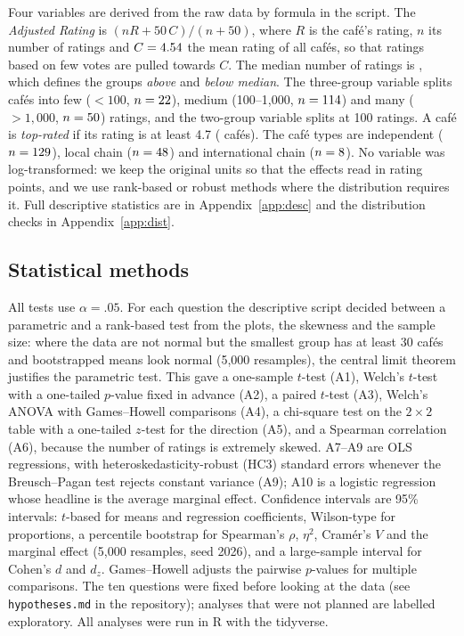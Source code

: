 \documentclass[11pt,a4paper]{article}
\begin{document}
Four variables are derived from the raw data by formula in the script. The \emph{Adjusted Rating} is $(n R + 50\,C)/(n + 50)$, where $R$ is the caf\'e's rating, $n$ its number of ratings and $C=4.54$ the mean rating of all caf\'es, so that ratings based on few votes are pulled towards $C$. The median number of ratings is \MedianN{}, which defines the groups \emph{above} and \emph{below median}. The three-group variable splits caf\'es into few ($<100$, $n=22$), medium (100--1,000, $n=114$) and many ($>1{,}000$, $n=50$) ratings, and the two-group variable splits at 100 ratings. A caf\'e is \emph{top-rated} if its rating is at least 4.7 (\NTopRated{} caf\'es). The caf\'e types are independent ($n=129$), local chain ($n=48$) and international chain ($n=8$). No variable was log-transformed: we keep the original units so that the effects read in rating points, and we use rank-based or robust methods where the distribution requires it. Full descriptive statistics are in Appendix~\ref{app:desc} and the distribution checks in Appendix~\ref{app:dist}.

\subsection{Statistical methods}
All tests use $\alpha=.05$. For each question the descriptive script decided between a parametric and a rank-based test from the plots, the skewness and the sample size: where the data are not normal but the smallest group has at least 30 caf\'es and bootstrapped means look normal (5{,}000 resamples), the central limit theorem justifies the parametric test. This gave a one-sample $t$-test (A1), Welch's $t$-test with a one-tailed $p$-value fixed in advance (A2), a paired $t$-test (A3), Welch's ANOVA with Games--Howell comparisons (A4), a chi-square test on the $2\times2$ table with a one-tailed $z$-test for the direction (A5), and a Spearman correlation (A6), because the number of ratings is extremely skewed. A7--A9 are OLS regressions, with heteroskedasticity-robust (HC3) standard errors whenever the Breusch--Pagan test rejects constant variance (A9); A10 is a logistic regression whose headline is the average marginal effect. Confidence intervals are 95\% intervals: $t$-based for means and regression coefficients, Wilson-type for proportions, a percentile bootstrap for Spearman's $\rho$, $\eta^2$, Cram\'er's $V$ and the marginal effect (5{,}000 resamples, seed 2026), and a large-sample interval for Cohen's $d$ and $d_z$. Games--Howell adjusts the pairwise $p$-values for multiple comparisons. The ten questions were fixed before looking at the data (see \texttt{hypotheses.md} in the repository); analyses that were not planned are labelled exploratory. All analyses were run in R \RVersion{} with the tidyverse.
\end{document}
